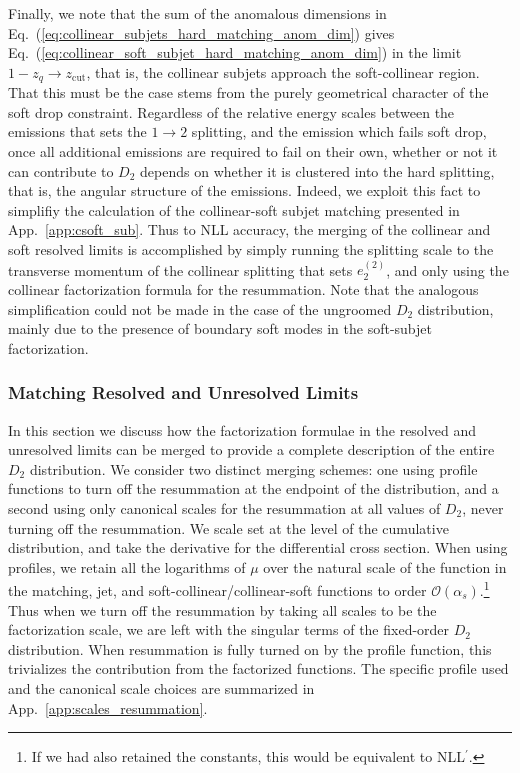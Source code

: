 \documentclass[a4paper,11pt]{article}
\newcommand{\ecf}[2]{e_{#1}^{(#2)}}
\DeclareRobustCommand{\App}[1]{App.~\ref{#1}}
\DeclareRobustCommand{\Eq}[1]{Eq.~(\ref{#1})}
\begin{document}
Finally, we note that the sum of the anomalous dimensions in \Eq{eq:collinear_subjets_hard_matching_anom_dim} gives \Eq{eq:collinear_soft_subjet_hard_matching_anom_dim} in the limit $1-z_q\rightarrow z_{\text{cut}}$, that is, the collinear subjets approach the soft-collinear region. That this must be the case stems from the purely geometrical character of the soft drop constraint. Regardless of the relative energy scales between the emissions that sets the $1\rightarrow 2$ splitting, and the emission which fails soft drop, once all additional emissions are required to fail on their own, whether or not it can contribute to $D_2$ depends on whether it is clustered into the hard splitting, that is, the angular structure of the emissions. Indeed, we exploit this fact to simplifiy the calculation of the collinear-soft subjet matching presented in \App{app:csoft_sub}. Thus to NLL accuracy, the merging of the collinear and soft resolved limits is accomplished by simply running the splitting scale to the transverse momentum of the collinear splitting that sets $\ecf{2}{2}$, and only using the collinear factorization formula for the resummation. Note that the analogous simplification could not be made in the case of the ungroomed $D_2$ distribution, mainly due to the presence of boundary soft modes in the soft-subjet factorization.

\subsubsection{Matching Resolved and Unresolved Limits}\label{sec:fact_merge_res_unres}



In this section we discuss how the factorization formulae in the resolved and unresolved limits can be merged to provide a complete description of the entire $D_2$ distribution. We consider two distinct merging schemes: one using profile functions \cite{Ligeti:2008ac,Abbate:2010xh} to turn off the resummation at the endpoint of the distribution, and a second using only canonical scales for the resummation at all values of $D_2$, never turning off the resummation. We scale set at the level of the cumulative distribution, and take the derivative for the differential cross section. When using profiles, we retain all the logarithms of $\mu$ over the natural scale of the function in the matching, jet, and soft-collinear/collinear-soft functions to order $\mathcal{O}(\alpha_s)$.\footnote{If we had also retained the constants, this would be equivalent to NLL$^{\prime}$.} Thus when we turn off the resummation by taking all scales to be the factorization scale, we are left with the singular terms of the fixed-order $D_2$ distribution. When resummation is fully turned on by the profile function, this trivializes the contribution from the factorized functions. The specific profile used and the canonical scale choices are summarized in \App{app:scales_resummation}.
\end{document}
